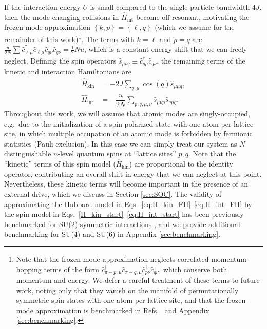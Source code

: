 \documentclass[aps,pra,nofootinbib,twocolumn,superscriptaddress]{revtex4-2}
\renewcommand{\t}{\text} %
\newcommand{\f}[2]{\dfrac{#1}{#2}} %
\newcommand{\p}[1]{\left(#1\right)} %
\renewcommand{\set}[1]{\left\{#1\right\}} %
\newcommand{\1}{\mathds{1}}
\renewcommand{\c}{\hat c}
\newcommand{\s}{\hat s}
\renewcommand{\H}{\hat H}
\begin{document}
If the interaction energy $U$ is small compared to the single-particle bandwidth $4J$, then the mode-changing collisions in $\H_{\t{int}}$ become off-resonant, motivating the frozen-mode approximation $\set{k,p}=\set{\ell,q}$ (which we assume for the remainder of this work)\footnote{Note that the frozen-mode approximation neglects correlated momentum-hopping terms of the form $\c_{\pi-p,\mu}^\dag \c_{\pi-q,\mu} \c_{p\nu}^\dag \c_{q\nu}$, which conserve both momentum and energy.
We defer a careful treatment of these terms to future work, noting only that they vanish on the manifold of permutationally symmetric spin states with one atom per lattice site, and that the frozen-mode approximation is benchmarked in Refs.~\cite{he2019engineering, smale2019observation} and Appendix \ref{sec:benchmarking}.}.
The terms with $k=\ell$ and $p=q$ are $\frac{u}{2N} \sum \c_{\ell\mu}^\dag \c_{\ell\mu} \c_{q\nu}^\dag \c_{q\nu} = \frac12 N u$, which is a constant  energy shift that we can freely neglect.
Defining the spin operators $\s_{\mu\nu q}\equiv \c_{q\mu}^\dag \c_{q\nu}$, the remaining terms of the kinetic and interaction Hamiltonians are
\begin{align}
  \H_{\t{kin}}
  &= -2J\sum_{q,\mu} \cos\p{q} \s_{\mu\mu q},
  \label{H_kin_start} \\
  \H_{\t{int}}
  &= -\f{u}{2N} \sum_{p,q,\mu,\nu} \s_{\mu\nu p} \s_{\nu\mu q}.
  \label{eq:H_int_start}
\end{align}
Throughout this work, we will assume that atomic modes are singly-occupied, e.g.~due to the initialization of a spin-polarized state with one atom per lattice site, in which multiple occupation of an atomic mode is forbidden by fermionic statistics (Pauli exclusion).
In this case we can simply treat our system as $N$ distinguishable $n$-level quantum spins at ``lattice sites'' $p,q$.
Note that the ``kinetic'' terms of this spin model ($\H_{\t{kin}}$) are proportional to the identity operator, contributing an overall shift in energy that we can neglect at this point.
Nevertheless, these kinetic terms will become important in the presence of an external drive, which we discuss in Section \ref{sec:SOC}.
The validity of approximating the Hubbard model in Eqs.~\eqref{eq:H_kin_FH}--\eqref{eq:H_int_FH} by the spin model in Eqs.~\eqref{H_kin_start}--\eqref{eq:H_int_start} has been previously benchmarked for SU(2)-symmetric interactions \cite{he2019engineering, smale2019observation}, and we provide additional benchmarking for SU(4) and SU(6) in Appendix \ref{sec:benchmarking}.
\end{document}
